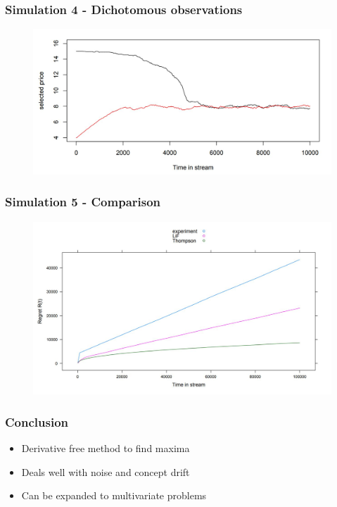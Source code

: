\documentclass{beamer}
\begin{document}
\begin{frame}
    \frametitle{Simulation 4 - Dichotomous observations}
     
    \begin{figure}
            \centering
            \includegraphics[width=\textwidth]{images/sim_4}
            \label{fig:alg}
        \end{figure}
\end{frame}

\begin{frame}
    \frametitle{Simulation 5 - Comparison}
     
    \begin{figure}
            \centering
            \includegraphics[width=\textwidth]{images/sim_5}
            \label{fig:alg}
        \end{figure}
\end{frame}

\begin{frame}
    \frametitle{Conclusion}
    \begin{itemize}
        \item Derivative free method to find maxima
        \item Deals well with noise and concept drift
        \item Can be expanded to multivariate problems
    \end{itemize}
\end{frame}
\end{document}
